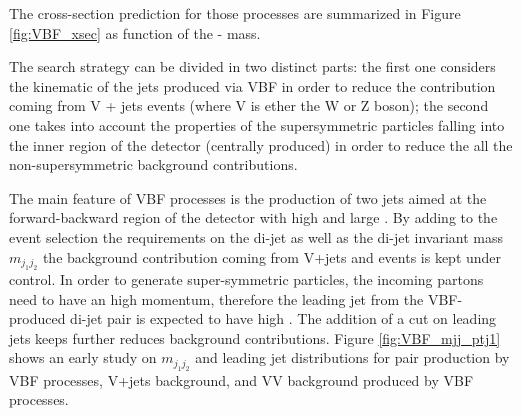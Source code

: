 The cross-section prediction for those processes are summarized in Figure \ref{fig:VBF_xsec} as function of the \charginomp - \neutralinotwo mass.

The search strategy can be divided in two distinct parts: the first one considers the kinematic of the jets produced via VBF in order to reduce the contribution coming  from V + jets events (where V is ether the W or Z boson); the second one takes into account the properties of the supersymmetric particles falling into the inner region of the detector (centrally produced) in order to reduce the all the non-supersymmetric background contributions.

The main feature of VBF processes is the production of two jets aimed at the forward-backward region of the detector with high \pt and large \deltaeta. By adding to the event selection the requirements on the di-jet \deltaeta as well as the di-jet invariant mass \ensuremath{m_{j_{1}j_{2}}} the background contribution coming from V+jets and \ttbar events is kept under control. In order to generate super-symmetric particles, the incoming partons need to have an high momentum, therefore the leading jet from the VBF-produced di-jet pair is expected to have high \pt. The addition of a \pt cut on leading jets keeps further reduces background contributions. Figure \ref{fig:VBF_mjj_ptj1} shows an early study on \ensuremath{m_{j_{1}j_{2}}} and leading jet \pt distributions for \charginopm \charginopm pair production by VBF processes, V+jets background, and VV background produced by VBF processes.

